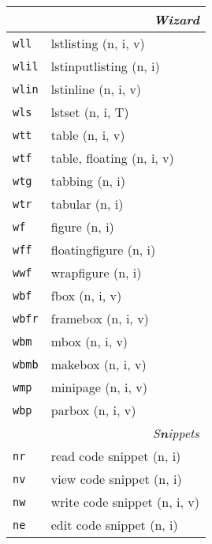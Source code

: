 \documentclass[oneside,10pt,landscape,DIV16]{scrartcl}
\newcommand{\Map}[1] {\textbf{\textasciiacute}\texttt{#1}}
\begin{document}
\begin{multicols}{3}
\begin{center}
\begin{tabular}[]{|p{11mm}|p{60mm}|}
\hline
\multicolumn{2}{|r|}{\textsl{\textbf{W}izard}}\\[1.0ex]
\hline  \Map{wll}  & lstlisting               \hfill (n, i, v)\\
\hline  \Map{wlil} & lstinputlisting          \hfill (n, i)\\
\hline  \Map{wlin} & lstinline                \hfill (n, i, v)\\
\hline  \Map{wls}  & lstset                   \hfill (n, i, T)\\
\hline
\hline  \Map{wtt}  & table                    \hfill (n, i, v)\\
\hline  \Map{wtf}  & table, floating          \hfill (n, i, v)\\
\hline  \Map{wtg}  & tabbing                  \hfill (n, i)\\
\hline  \Map{wtr}  & tabular                  \hfill (n, i)\\
\hline
\hline  \Map{wf}   & figure                   \hfill (n, i)\\
\hline  \Map{wff}  & floatingfigure           \hfill (n, i)\\
\hline  \Map{wwf}  & wrapfigure               \hfill (n, i)\\
\hline
\hline  \Map{wbf}  & fbox                     \hfill (n, i, v)\\
\hline  \Map{wbfr} & framebox                 \hfill (n, i, v)\\
\hline  \Map{wbm}  & mbox                     \hfill (n, i, v)\\
\hline  \Map{wbmb} & makebox                  \hfill (n, i, v)\\
\hline  \Map{wmp}  & minipage                 \hfill (n, i, v)\\
\hline  \Map{wbp}  & parbox                   \hfill (n, i, v)\\
\hline
\hline
\multicolumn{2}{|r|}{\textsl{S\textbf{n}ippets}}                \\[1.0ex]
\hline \Map{nr}  & read code snippet         \hfill (n, i)   \\
\hline \Map{nv}  & view code snippet         \hfill (n, i)   \\
\hline \Map{nw}  & write code snippet        \hfill (n, i, v)\\
\hline \Map{ne}  & edit code snippet         \hfill (n, i)   \\

\end{tabular}
\end{center}
\end{multicols}
\end{document}

